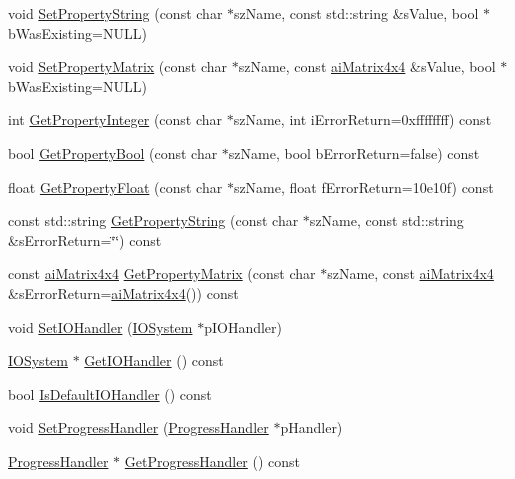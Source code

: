\begin{DoxyCompactItemize}
void \hyperlink{class_assimp_1_1_importer_a8f79ecb5c6f67a76fc87654c32986e8e}{Set\-Property\-String} (const char $\ast$sz\-Name, const std\-::string \&s\-Value, bool $\ast$b\-Was\-Existing=N\-U\-L\-L)
\item 
void \hyperlink{class_assimp_1_1_importer_a3231ab8031c6fff87c0ce9eba0314a02}{Set\-Property\-Matrix} (const char $\ast$sz\-Name, const \hyperlink{structai_matrix4x4}{ai\-Matrix4x4} \&s\-Value, bool $\ast$b\-Was\-Existing=N\-U\-L\-L)
\item 
int \hyperlink{class_assimp_1_1_importer_a3e796a0758a9f10f13107f44c542ad41}{Get\-Property\-Integer} (const char $\ast$sz\-Name, int i\-Error\-Return=0xffffffff) const 
\item 
bool \hyperlink{class_assimp_1_1_importer_a90f5d35d25e5d2a0ef8bc0c6545b2010}{Get\-Property\-Bool} (const char $\ast$sz\-Name, bool b\-Error\-Return=false) const 
\item 
float \hyperlink{class_assimp_1_1_importer_a9a99a3467d6386ddcfbe2823f16b6640}{Get\-Property\-Float} (const char $\ast$sz\-Name, float f\-Error\-Return=10e10f) const 
\item 
const std\-::string \hyperlink{class_assimp_1_1_importer_aa31cc1aa8f83056fe097b149354ddfd3}{Get\-Property\-String} (const char $\ast$sz\-Name, const std\-::string \&s\-Error\-Return=\char`\"{}\char`\"{}) const 
\item 
const \hyperlink{structai_matrix4x4}{ai\-Matrix4x4} \hyperlink{class_assimp_1_1_importer_a1b2e36eab7155233846b24ec30e7e273}{Get\-Property\-Matrix} (const char $\ast$sz\-Name, const \hyperlink{structai_matrix4x4}{ai\-Matrix4x4} \&s\-Error\-Return=\hyperlink{structai_matrix4x4}{ai\-Matrix4x4}()) const 
\item 
void \hyperlink{class_assimp_1_1_importer_a1161f46318af18bb86dfe0fc3edea4df}{Set\-I\-O\-Handler} (\hyperlink{class_assimp_1_1_i_o_system}{I\-O\-System} $\ast$p\-I\-O\-Handler)
\item 
\hyperlink{class_assimp_1_1_i_o_system}{I\-O\-System} $\ast$ \hyperlink{class_assimp_1_1_importer_abe3af30f4c5eae2e875b0f32068be44d}{Get\-I\-O\-Handler} () const 
\item 
bool \hyperlink{class_assimp_1_1_importer_ae3f26466cf7756594216ffedbc247563}{Is\-Default\-I\-O\-Handler} () const 
\item 
void \hyperlink{class_assimp_1_1_importer_a6a4d830ffb3f77a3c7c919e0af006920}{Set\-Progress\-Handler} (\hyperlink{class_assimp_1_1_progress_handler}{Progress\-Handler} $\ast$p\-Handler)
\item 
\hyperlink{class_assimp_1_1_progress_handler}{Progress\-Handler} $\ast$ \hyperlink{class_assimp_1_1_importer_a1fa669f0edc504fdf9178e8e22c728ad}{Get\-Progress\-Handler} () const 

\end{DoxyCompactItemize}
